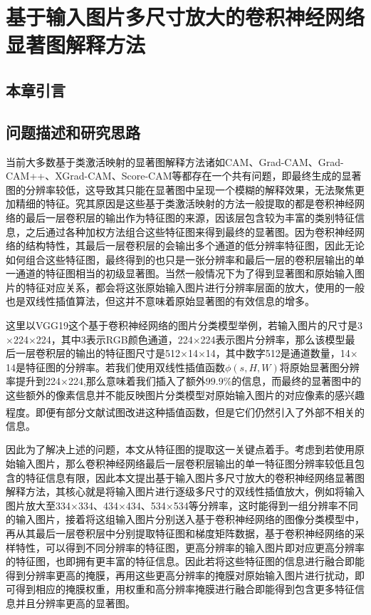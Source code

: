 

\chapter{基于输入图片多尺寸放大的卷积神经网络显著图解释方法}
\thispagestyle{others}
\pagestyle{others}
\xiaosi

\section{本章引言}



\section{问题描述和研究思路}
当前大多数基于类激活映射的显著图解释方法诸如CAM、Grad-CAM、Grad-CAM++、XGrad-CAM、Score-CAM等都存在一个共有问题，即最终生成的显著图的分辨率较低，这导致其只能在显著图中呈现一个模糊的解释效果，无法聚焦更加精细的特征。究其原因是这些基于类激活映射的方法一般提取的都是卷积神经网络的最后一层卷积层的输出作为特征图的来源，因该层包含较为丰富的类别特征信息，之后通过各种加权方法组合这些特征图来得到最终的显著图。因为卷积神经网络的结构特性，其最后一层卷积层的会输出多个通道的低分辨率特征图，因此无论如何组合这些特征图，最终得到的也只是一张分辨率和最后一层的卷积层输出的单一通道的特征图相当的初级显著图。当然一般情况下为了得到显著图和原始输入图片的特征对应关系，都会将这张原始输入图片进行分辨率层面的放大，使用的一般也是双线性插值算法，但这并不意味着原始显著图的有效信息的增多。

这里以VGG19这个基于卷积神经网络的图片分类模型举例，若输入图片的尺寸是3$\times$224$\times$224，其中3表示RGB颜色通道，224$\times$224表示图片分辨率，那么该模型最后一层卷积层的输出的特征图尺寸是512$\times$14$\times$14，其中数字512是通道数量，14$\times$14是特征图的分辨率。若我们使用双线性插值函数$\phi(s,H,W)$将原始显著图分辨率提升到224$\times$224,那么意味着我们插入了额外99.9\%的信息，而最终的显著图中的这些额外的像素信息并不能反映图片分类模型对原始输入图片的对应像素的感兴趣程度。即便有部分文献\textsuperscript{\cite{adebayo2018sanity}\cite{selvaraju2017grad}}试图改进这种插值函数，但是它们仍然引入了外部不相关的信息。

因此为了解决上述的问题，本文从特征图的提取这一关键点着手。考虑到若使用原始输入图片，那么卷积神经网络最后一层卷积层输出的单一特征图分辨率较低且包含的特征信息有限，因此本文提出基于输入图片多尺寸放大的卷积神经网络显著图解释方法，其核心就是将输入图片进行逐级多尺寸的双线性插值放大，例如将输入图片放大至334$\times$334、434$\times$434、534$\times$534等分辨率，这时能得到一组分辨率不同的输入图片，接着将这组输入图片分别送入基于卷积神经网络的图像分类模型中，再从其最后一层卷积层中分别提取特征图和梯度矩阵数据，基于卷积神经网络的采样特性，可以得到不同分辨率的特征图，更高分辨率的输入图片即对应更高分辨率的特征图，也即拥有更丰富的特征信息。因此若将这些特征图的信息进行融合即能得到分辨率更高的掩膜，再用这些更高分辨率的掩膜对原始输入图片进行扰动，即可得到相应的掩膜权重，用权重和高分辨率掩膜进行融合即能得到包含更多特征信息并且分辨率更高的显著图。
